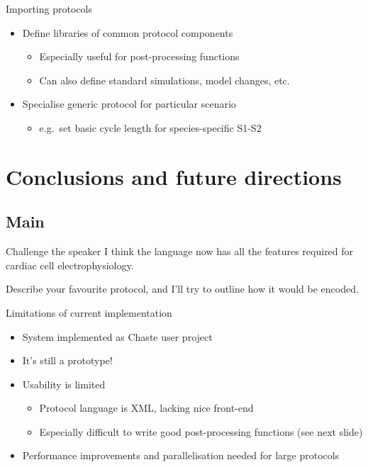 \documentclass[t,xcolor={usenames,dvipsnames}]{beamer}
\newcommand{\subitem}[1]{\begin{itemize}[<.->]\item #1 \end{itemize}}
\begin{document}
\begin{frame}{Importing protocols}
\begin{itemize}
\item Define libraries of common protocol components
  \begin{itemize}
  \item Especially useful for post-processing functions
  \item Can also define standard simulations, model changes, etc.
  \end{itemize}
\item Specialise generic protocol for particular scenario
  \subitem{e.g.\ set basic cycle length for species-specific S1-S2}
\end{itemize}
\end{frame}

\section{Conclusions and future directions}
\subsection*{Main}

\begin{frame}{Challenge the speaker}
I think the language now has all the features required for cardiac cell electrophysiology.

Describe your favourite protocol, and I'll try to outline how it would be encoded.
\end{frame}

\begin{frame}{Limitations of current implementation}
\begin{itemize}
\item System implemented as Chaste user project
\item It's still a prototype!
\item Usability is limited
  \begin{itemize}
  \item Protocol language is XML, lacking nice front-end
  \item Especially difficult to write good post-processing functions (see next slide)
  \end{itemize}
\item Performance improvements and parallelisation needed for large protocols
\end{itemize}
\end{frame}
\end{document}
